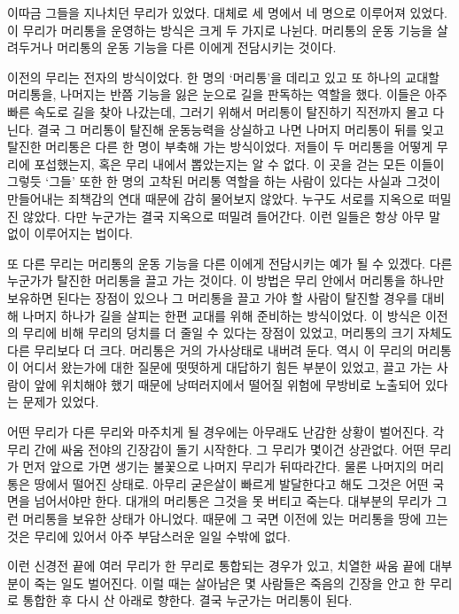 \documentclass[12pt, b6paper, openany]{memoir}
\newenvironment{article}{}{}
\begin{document}
\begin{article}
이따금 그들을 지나치던 무리가 있었다. 대체로 세 명에서 네 명으로 이루어져 있었다. 이 무리가 머리통을 운영하는 방식은 크게 두 가지로 나뉜다. 머리통의 운동 기능을 살려두거나 머리통의 운동 기능을 다른 이에게 전담시키는 것이다.

이전의 무리는 전자의 방식이었다. 한 명의 `머리통'을 데리고 있고 또 하나의 교대할 머리통을, 나머지는 반쯤 기능을 잃은 눈으로 길을 판독하는 역할을 했다. 이들은 아주 빠른 속도로 길을 찾아 나갔는데, 그러기 위해서 머리통이 탈진하기 직전까지 몰고 다닌다. 결국 그 머리통이 탈진해 운동능력을 상실하고 나면 나머지 머리통이 뒤를 잊고 탈진한 머리통은 다른 한 명이 부축해 가는 방식이었다. 저들이 두 머리통을 어떻게 무리에 포섭했는지, 혹은 무리 내에서 뽑았는지는 알 수 없다. 이 곳을 걷는 모든 이들이 그렇듯 `그들' 또한 한 명의 고착된 머리통 역할을 하는 사람이 있다는 사실과 그것이 만들어내는 죄책감의 연대 때문에 감히 물어보지 않았다. 누구도 서로를 지옥으로 떠밀진 않았다. 다만 누군가는 결국 지옥으로 떠밀려 들어간다. 이런 일들은 항상 아무 말 없이 이루어지는 법이다.

또 다른 무리는 머리통의 운동 기능을 다른 이에게 전담시키는 예가 될 수 있겠다. 다른 누군가가 탈진한 머리통을 끌고 가는 것이다. 이 방법은 무리 안에서 머리통을 하나만 보유하면 된다는 장점이 있으나 그 머리통을 끌고 가야 할 사람이 탈진할 경우를 대비해 나머지 하나가 길을 살피는 한편 교대를 위해 준비하는 방식이었다. 이 방식은 이전의 무리에 비해 무리의 덩치를 더 줄일 수 있다는 장점이 있었고, 머리통의 크기 자체도 다른 무리보다 더 크다. 머리통은 거의 가사상태로 내버려 둔다. 역시 이 무리의 머리통이 어디서 왔는가에 대한 질문에 떳떳하게 대답하기 힘든 부분이 있었고, 끌고 가는 사람이 앞에 위치해야 했기 때문에 낭떠러지에서 떨어질 위험에 무방비로 노출되어 있다는 문제가 있었다.

어떤 무리가 다른 무리와 마주치게 될 경우에는 아무래도 난감한 상황이 벌어진다. 각 무리 간에 싸움 전야의 긴장감이 돌기 시작한다. 그 무리가 몇이건 상관없다. 어떤 무리가 먼저 앞으로 가면 생기는 불꽃으로 나머지 무리가 뒤따라간다. 물론 나머지의 머리통은 땅에서 떨어진 상태로. 아무리 굳은살이 빠르게 발달한다고 해도 그것은 어떤 국면을 넘어서야만 한다. 대개의 머리통은 그것을 못 버티고 죽는다. 대부분의 무리가 그런 머리통을 보유한 상태가 아니었다. 때문에 그 국면 이전에 있는 머리통을 땅에 끄는 것은 무리에 있어서 아주 부담스러운 일일 수밖에 없다.

이런 신경전 끝에 여러 무리가 한 무리로 통합되는 경우가 있고, 치열한 싸움 끝에 대부분이 죽는 일도 벌어진다. 이럴 때는 살아남은 몇 사람들은 죽음의 긴장을 안고 한 무리로 통합한 후 다시 산 아래로 향한다. 결국 누군가는 머리통이 된다.


\end{article}
\end{document}
